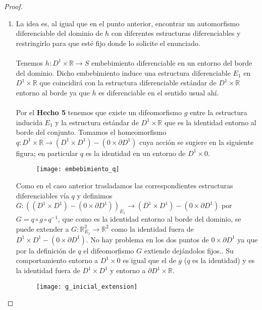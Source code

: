\begin{proof}
\begin{enumerate}
		\item La idea es, al igual que en el punto anterior, encontrar un automorfismo diferenciable del dominio de $h$ con diferentes estructuras diferenciables y restringirlo para que esté fijo donde lo solicite el enunciado.\\
			\\ Tenemos $h: D^1\times \mathbb{R} \rightarrow S$ embebimiento diferenciable en un entorno del borde del dominio. Dicho embebimiento induce una estructura diferenciable $E_1$ en $D^1\times \mathbb{R}$ que coincidirá con la estructura diferenciable estándar de $D^1\times \mathbb{R}$ entorno al borde ya que $h$ es diferenciable en el sentido usual ahí.\\
			\\ Por el \textbf{Hecho 5} tenemos que existe un difeomorfismo $g$ entre la estructura inducida $E_1$ y la estructura estándar de $D^1\times \mathbb{R}$ que es la identidad entorno al borde del conjunto. Tomamos el homeomorfismo $q: D^1\times \mathbb{R} \rightarrow (D^1\times D^1) - (0 \times \partial D^1)$ cuya acción se sugiere en la siguiente figura; en particular $q$ es la identidad en un entorno de $D^1 \times 0$.
			
			\begin{figure}[h]
  				\centering
  				\texttt{[image: embebimiento\_q]}
  				\label{fig:embebimiento_q}
			\end{figure}
			
			Como en el caso anterior trasladamos las correspondientes estructuras diferenciables vía $q$ y definimos $G:  ((D^1\times D^1) - (0 \times \partial D^1))_{E_1} \rightarrow (D^1\times D^1) - (0 \times \partial D^1)$ por $G = q \circ g \circ q^{-1}$, que como es la identidad entorno al borde del dominio, se puede extender a $G:\mathbb{R}^2_{E_1} \rightarrow \mathbb{R}^2$ como la identidad fuera de $D^1 \times D^1 - (0 \times \partial D^1)$. No hay problema en los dos puntos de $0 \times \partial D^1$ ya que por la definición de $q$ el difeomorfismo $G$ extiende dejándolos fijos.. Su comportamiento entorno a $D^1 \times 0$ es igual que el de $g$ ($q$ es la identidad) y es la identidad fuera de $D^1 \times D^1$ y entorno a $\partial D^1 \times \mathbb{R}$.\\
			
			\begin{figure}[h]
  				\centering
  				\texttt{[image: g\_inicial\_extension]}
  				\label{fig:g_inicial_extension}
			\end{figure}
			

\end{enumerate}
\end{proof}
